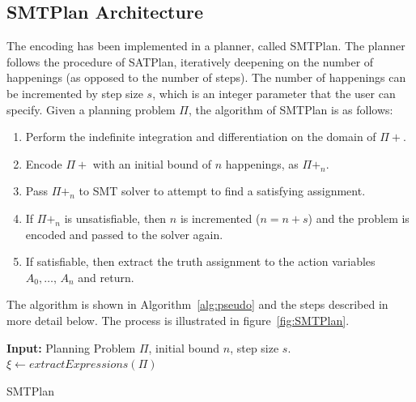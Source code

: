 \subsection{SMTPlan Architecture} \label{sssec:SMTPlan_Archi}

The encoding has been implemented in a planner, called SMTPlan. The planner follows the procedure of SATPlan, iteratively deepening on the number of happenings (as opposed to the number of steps). The number of happenings can be incremented by step size $s$, which is an integer parameter that the user can specify. Given a planning problem $\Pi$, the algorithm of SMTPlan is as follows:

\begin{enumerate}
\item
Perform the indefinite integration and differentiation on the domain of $\Pi+$.
\item
Encode $\Pi+$ with an initial bound of $n$ happenings, as $\Pi+_n$.
\item
Pass $\Pi+_n$ to SMT solver to attempt to find a satisfying assignment.
\item
If $\Pi+_n$ is unsatisfiable, then $n$ is incremented ($n=n+s$) and the problem is encoded and passed to the solver again.
\item
If satisfiable, then extract the truth assignment to the action variables $A_0, \ldots,\, A_n$ and return.
\end{enumerate}
The algorithm is shown in Algorithm~\ref{alg:pseudo} and the steps described in more detail below. The process is illustrated in figure~\ref{fig:SMTPlan}.

\begin{algorithm}
\SetAlgoLined
\textbf{Input:} Planning Problem $\Pi$, initial bound $n$, step size $s$.\\
$\xi \leftarrow extractExpressions(\Pi)$
\caption{SMTPlan}
\label{alg:pseudo}
\end{algorithm}

